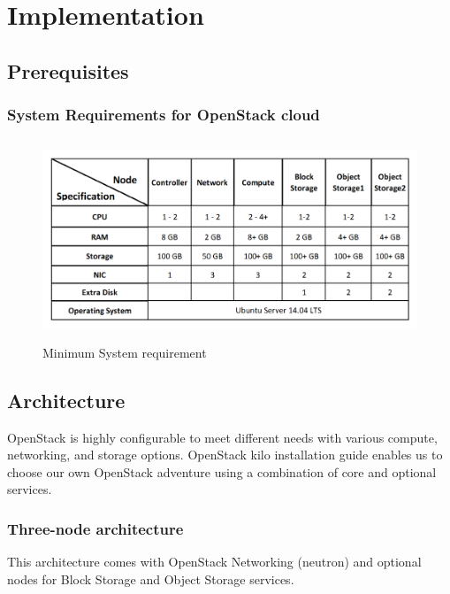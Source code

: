 \chapter{Implementation\cite{docs}}

    \section{Prerequisites}
        \subsection{System Requirements for OpenStack cloud}
        \begin{figure}[h]
             \centering
            \includegraphics[height=6cm,width=13cm]{images/hw.png}
            \caption{Minimum System requirement} %
        \end{figure}

\section{Architecture}
    \par OpenStack is highly configurable to meet different needs with various compute, networking, and storage options. OpenStack kilo installation guide enables us to choose our own OpenStack adventure using a combination of core and optional services.
    
    \subsection{Three-node architecture}
    \par This architecture comes with OpenStack Networking (neutron) and optional nodes for Block Storage and Object Storage services.
    
